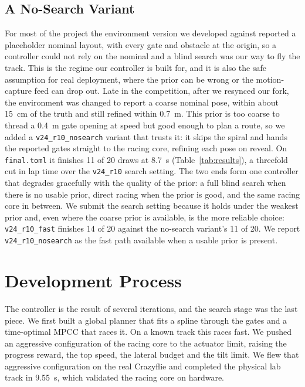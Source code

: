 \documentclass[conference]{IEEEtran}
\begin{document}
\subsection{A No-Search Variant}
\label{sec:nosearch}
For most of the project the environment version we developed against reported a placeholder nominal layout, with every gate and obstacle at the origin, so a controller could not rely on the nominal and a blind search was our way to fly the track. This is the regime our controller is built for, and it is also the safe assumption for real deployment, where the prior can be wrong or the motion-capture feed can drop out. Late in the competition, after we resynced our fork, the environment was changed to report a coarse nominal pose, within about 15~cm of the truth and still refined within 0.7~m. This prior is too coarse to thread a 0.4~m gate opening at speed but good enough to plan a route, so we added a \texttt{v24\_r10\_nosearch} variant that trusts it: it skips the spiral and hands the reported gates straight to the racing core, refining each pose on reveal. On \texttt{final.toml} it finishes 11 of 20 draws at 8.7~s (Table~\ref{tab:results}), a threefold cut in lap time over the \texttt{v24\_r10} search setting. The two ends form one controller that degrades gracefully with the quality of the prior: a full blind search when there is no usable prior, direct racing when the prior is good, and the same racing core in between. We submit the search setting because it holds under the weakest prior and, even where the coarse prior is available, is the more reliable choice: \texttt{v24\_r10\_fast} finishes 14 of 20 against the no-search variant's 11 of 20. We report \texttt{v24\_r10\_nosearch} as the fast path available when a usable prior is present.

\section{Development Process}
\label{sec:process}
The controller is the result of several iterations, and the search stage was the last piece. We first built a global planner that fits a spline through the gates and a time-optimal MPCC that races it. On a known track this races fast. We pushed an aggressive configuration of the racing core to the actuator limit, raising the progress reward, the top speed, the lateral budget and the tilt limit. We flew that aggressive configuration on the real Crazyflie and completed the physical lab track in 9.55~s, which validated the racing core on hardware.
\end{document}
